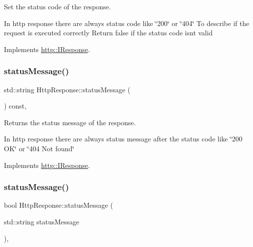 Set the status code of the response. 

In http response there are always status code like \char`\"{}200\char`\"{} or \char`\"{}404\char`\"{} To describe if the request is executed correctly Return false if the status code isn\textquotesingle{}t valid 

Implements \hyperlink{structhttp_1_1IResponse_a7d85b2b27acb82d13cf26eb0d3801735}{http\+::\+I\+Response}.

\mbox{\label{classHttpResponse_a5463015a6d521c4c4da46505c0740f63}} 
\subsubsection{\texorpdfstring{status\+Message()}{statusMessage()}\hspace{0.1cm}{\footnotesize\ttfamily [1/2]}}
{\footnotesize\ttfamily std\+::string Http\+Response\+::status\+Message (\begin{DoxyParamCaption}{ }\end{DoxyParamCaption}) const\hspace{0.3cm}{\ttfamily [virtual]}, {\ttfamily [noexcept]}}



Returns the status message of the response. 

In http response there are always status message after the status code like \char`\"{}200 O\+K\char`\"{} or \char`\"{}404 Not found\char`\"{} 

Implements \hyperlink{structhttp_1_1IResponse_a4339fd29b105c9ea5319b2e01f27290c}{http\+::\+I\+Response}.

\mbox{\label{classHttpResponse_ad705d5d1846c261e2ca80c24c9e1d75c}} 
\subsubsection{\texorpdfstring{status\+Message()}{statusMessage()}\hspace{0.1cm}{\footnotesize\ttfamily [2/2]}}
{\footnotesize\ttfamily bool Http\+Response\+::status\+Message (\begin{DoxyParamCaption}\item[{std\+::string}]{status\+Message }\end{DoxyParamCaption})\hspace{0.3cm}{\ttfamily [virtual]}, {\ttfamily [noexcept]}}



